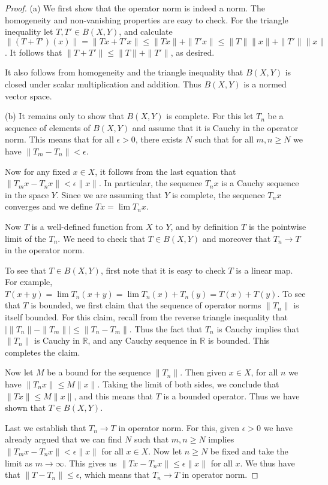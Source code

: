 \documentclass[11pt,oneside]{amsbook}
\newcommand{\RR}{{\mathbb R}}
\theoremstyle{definition}
\theoremstyle{plain}
\theoremstyle{definition}
\theoremstyle{remark}
\numberwithin{equation}{section}
\numberwithin{figure}{section}
\begin{document}
\begin{proof}
  (a) We first show that the operator norm is indeed a norm. The homogeneity and non-vanishing properties are easy to check. For the triangle inequality let $T,T'\in B(X,Y)$, and calculate $\|(T+T')(x)\|=\|Tx+T'x\|\leq\|Tx\|+\|T'x\|\leq\|T\|\|x\|+\|T'\|\|x\|$. It follows that $\|T+T'\|\leq\|T\|+\|T'\|$, as desired.

  It also follows from homogeneity and the triangle inequality that $B(X,Y)$ is closed under scalar multiplication and addition. Thus $B(X,Y)$ is a normed vector space.

  (b) It remains only to show that $B(X,Y)$ is complete. For this let $T_n$ be a sequence of elements of $B(X,Y)$ and assume that it is Cauchy in the operator norm. This means that for all $\epsilon>0$, there exists $N$ such that for all $m,n\geq N$ we have $\|T_m-T_n\|<\epsilon$.

  Now for any fixed $x\in X$, it follows from the last equation that $\|T_mx-T_nx\|<\epsilon\|x\|$. In particular, the sequence $T_nx$ is a Cauchy sequence in the space $Y$. Since we are assuming that $Y$ is complete, the sequence $T_nx$ converges and we define $Tx=\lim T_nx$.

  Now $T$ is a well-defined function from $X$ to $Y$, and by definition $T$ is the pointwise limit of the $T_n$. We need to check that $T\in B(X,Y)$ and moreover that $T_n\to T$ in the operator norm.

  To see that $T\in B(X,Y)$, first note that it is easy to check $T$ is a linear map. For example, $T(x+y)=\lim T_n(x+y)=\lim T_n(x)+T_n(y)=T(x)+T(y)$. To see that $T$ is bounded, we first claim that the sequence of operator norms $\|T_n\|$ is itself bounded. For this claim, recall from the reverse triangle inequality that $|\|T_n\|-\|T_m\||\leq\|T_n-T_m\|$. Thus the fact that $T_n$ is Cauchy implies that $\|T_n\|$ is Cauchy in $\RR$, and any Cauchy sequence in $\RR$ is bounded. This completes the claim.

  Now let $M$ be a bound for the sequence $\|T_n\|$. Then given $x\in X$, for all $n$ we have $\|T_nx\|\leq M\|x\|$. Taking the limit of both sides, we conclude that $\|Tx\|\leq M\|x\|$, and this means that $T$ is a bounded operator. Thus we have shown that $T\in B(X,Y)$.

  Last we establish that $T_n\to T$ in operator norm. For this, given $\epsilon>0$ we have already argued that we can find $N$ such that $m,n\geq N$ implies $\|T_mx-T_nx\|<\epsilon\|x\|$ for all $x\in X$. Now let $n\geq N$ be fixed and take the limit as $m\to\infty$. This gives us $\|Tx-T_nx\|\leq\epsilon\|x\|$ for all $x$. We thus have that $\|T-T_n\|\leq\epsilon$, which means that $T_n\to T$ in operator norm.
\end{proof}
\end{document}
